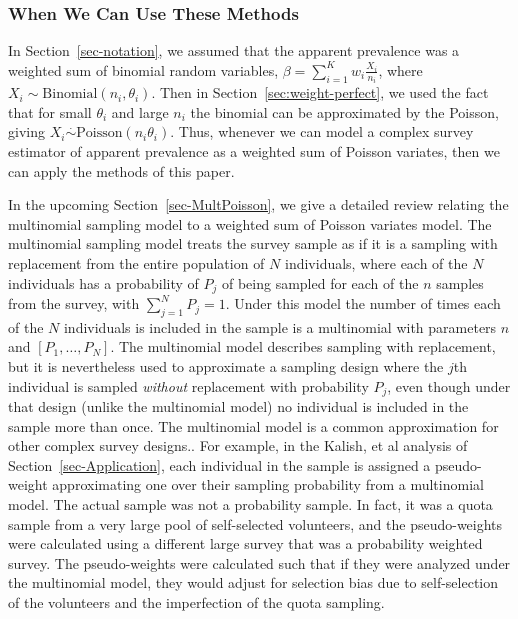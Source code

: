 \subsubsection{When We Can Use These Methods}

In Section~\ref{sec-notation}, we assumed that the apparent prevalence was a weighted sum of binomial random variables,
$\beta = \sum_{i=1}^{K} w_i \frac{X_i}{n_i}$, where $X_i \sim \textrm{Binomial}(n_i,\theta_i)$.
Then in Section~\ref{sec:weight-perfect}, we used the fact that for small $\theta_i$ and large $n_i$
the binomial can be approximated by the Poisson, giving $X_i \stackrel{\cdot}{\sim} \textrm{Poisson}( n_i \theta_i)$.
Thus, whenever we can model a complex survey estimator of apparent prevalence as a weighted sum of Poisson variates, then we can apply the methods of this paper.

In the upcoming Section~\ref{sec-MultPoisson}, we give a detailed review relating the multinomial sampling model to a weighted sum of Poisson variates model.
The multinomial sampling model treats the survey sample as if it is a sampling with replacement from the entire population of $N$ individuals, where each of the $N$
individuals has a probability of $P_j$ of being sampled for each of the $n$ samples from the survey, with $\sum_{j=1}^{N} P_j = 1$. Under this model the number of times each of the $N$ individuals
is included in the sample is a multinomial with parameters $n$ and $[P_1,\ldots, P_N]$.
The multinomial model describes sampling with replacement, but it is nevertheless used to approximate a sampling design where the $j$th individual is sampled {\it without} replacement with probability $P_j$, even though under that design (unlike the multinomial model) no individual is included in the sample more than once. The multinomial model is a common approximation for other complex survey designs.\citep[see e.g.,][p. 14]{Korn:1999}.
For example, in the Kalish, et al\cite{Kali:2021} analysis of Section~\ref{sec-Application}, each individual in the sample is assigned a pseudo-weight approximating one over their sampling probability from
a multinomial model. The actual sample was not a probability sample. In fact, it was a quota sample from a very large pool of self-selected volunteers, and the pseudo-weights were calculated using a different large survey that was a probability weighted survey. The pseudo-weights were calculated such that if they were analyzed under the multinomial model, they would adjust for selection bias due to self-selection of the volunteers and the imperfection of the quota sampling.

